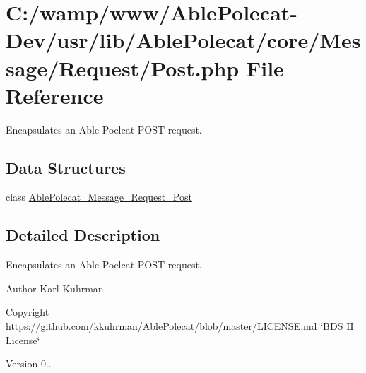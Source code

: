 \hypertarget{_post_8php}{}\section{C\+:/wamp/www/\+Able\+Polecat-\/\+Dev/usr/lib/\+Able\+Polecat/core/\+Message/\+Request/\+Post.php File Reference}
\label{_post_8php}


Encapsulates an Able Poelcat P\+O\+S\+T request.  


\subsection*{Data Structures}
\begin{DoxyCompactItemize}
\item 
class \hyperlink{class_able_polecat___message___request___post}{Able\+Polecat\+\_\+\+Message\+\_\+\+Request\+\_\+\+Post}
\end{DoxyCompactItemize}


\subsection{Detailed Description}
Encapsulates an Able Poelcat P\+O\+S\+T request. 

\begin{DoxyAuthor}{Author}
Karl Kuhrman 
\end{DoxyAuthor}
\begin{DoxyCopyright}{Copyright}
https\+://github.com/kkuhrman/\+Able\+Polecat/blob/master/\+L\+I\+C\+E\+N\+S\+E.\+md \char`\"{}\+B\+D\+S I\+I License\char`\"{} 
\end{DoxyCopyright}
\begin{DoxyVersion}{Version}
0.. 
\end{DoxyVersion}
